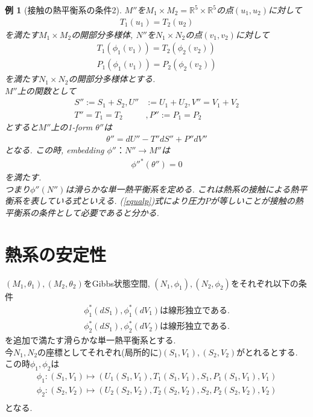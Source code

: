 \documentclass[a4paper,12pt]{ltjsarticle}
\theoremstyle{break}
\newtheorem{eg}[thm]{例}
\newcommand{\mbr}{\mathbb{R}}
\newcommand{\mt}{\mapsto}
\newcommand{\ti}{\times}
\numberwithin{equation}{section}
\begin{document}
\begin{eg}[接触の熱平衡系の条件2]
  $M''$を$M_1 \ti M_2 = \mbr^5 \ti \mbr^5$の点$(u_1,u_2)$に対して
  \begin{align*}
    T_1(u_1)=T_2(u_2)
  \end{align*}
  を満たす$M_1 \ti M_2$の開部分多様体, 
  $N''$を$N_1 \ti N_2$の点$(v_1,v_2)$に対して
  \begin{align}
    T_1(\phi_1(v_1))
    = T_2(\phi_2(v_2)) \\
    \label{equalp}
    P_1(\phi_1(v_1))
    = P_2(\phi_2(v_2))
  \end{align}
  を満たす$N_1 \ti N_2$の開部分多様体とする. \\
  $M''$上の関数として
  \begin{align*}
    S'':=S_1+S_2, U'' &:=U_1+U_2, V''=V_1+V_2 \\
    T''=T_1=T_2 &, P'':=P_1=P_2 
  \end{align*}
  とすると$M''$上の1-form $\theta''$は
  \begin{align*}
    \theta''
    =dU'' - T''dS'' + P''dV''
  \end{align*}
  となる. 
  この時, embedding $\phi''：N'' \to M''$は
  \begin{align*}
    \phi''^*(\theta'')
    = 0
  \end{align*}
  を満たす. \\
  つまり$\phi''(N'')$は滑らかな単一熱平衡系を定める. 
  これは熱系の接触による熱平衡系を表している式といえる.
  (\ref{equalp})式により圧力$P$が等しいことが接触の熱平衡系の条件として必要であると分かる.  
\end{eg}

\newpage

\section{熱系の安定性}

$(M_1,\theta_1),(M_2,\theta_2)$をGibbs状態空間, 
$(N_1,\phi_1),(N_2,\phi_2)$をそれぞれ以下の条件
\begin{align*}
  \phi_1^*(dS_1),\phi_1^*(dV_1) \text{は線形独立である.} \\
  \phi_2^*(dS_1),\phi_2^*(dV_2) \text{は線形独立である.}
\end{align*}
を追加で満たす滑らかな単一熱平衡系とする. \\
今$N_1,N_2$の座標としてそれぞれ(局所的に)$(S_1,V_1),(S_2,V_2)$がとれるとする. この時$\phi_1,\phi_2$は
\begin{align*}
  \phi_1: (S_1,V_1) \mt (U_1(S_1,V_1), T_1(S_1,V_1), S_1, P_1(S_1,V_1), V_1) \\
  \phi_2: (S_2,V_2) \mt (U_2(S_2,V_2), T_2(S_2,V_2), S_2, P_2(S_2,V_2), V_2) \\
\end{align*}
となる. \\
\end{document}
